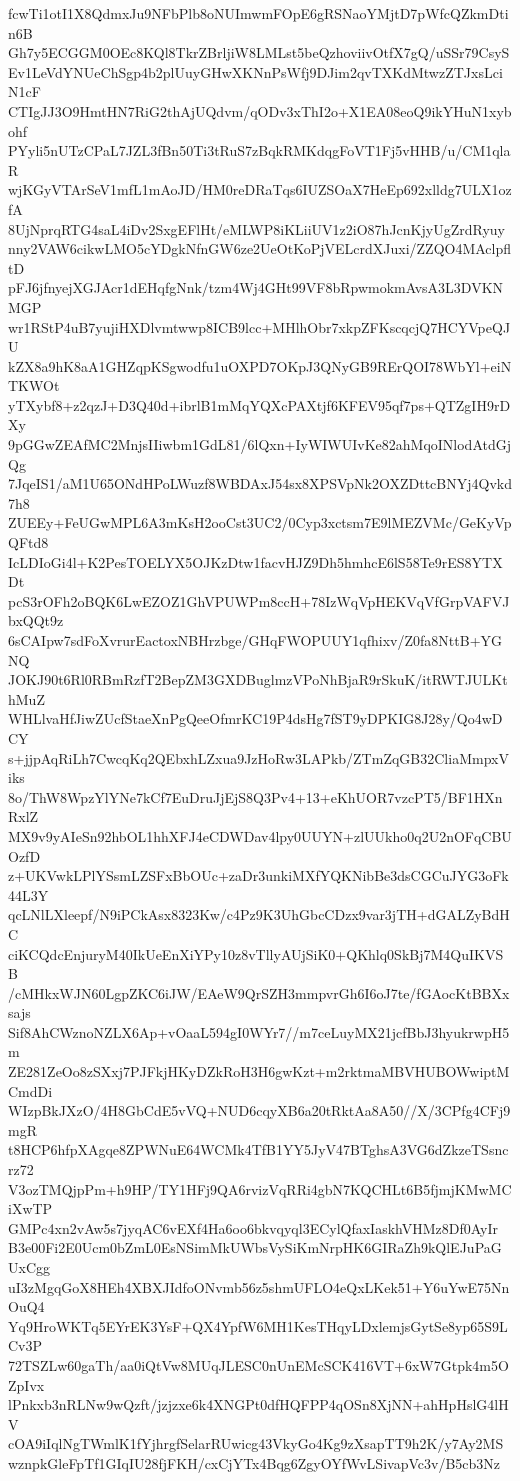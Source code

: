 fcwTi1otI1X8QdmxJu9NFbPlb8oNUImwmFOpE6gRSNaoYMjtD7pWfcQZkmDtin6B
Gh7y5ECGGM0OEc8KQl8TkrZBrljiW8LMLst5beQzhoviivOtfX7gQ/uSSr79CsyS
Ev1LeVdYNUeChSgp4b2plUuyGHwXKNnPsWfj9DJim2qvTXKdMtwzZTJxsLciN1cF
CTIgJJ3O9HmtHN7RiG2thAjUQdvm/qODv3xThI2o+X1EA08eoQ9ikYHuN1xybohf
PYyli5nUTzCPaL7JZL3fBn50Ti3tRuS7zBqkRMKdqgFoVT1Fj5vHHB/u/CM1qlaR
wjKGyVTArSeV1mfL1mAoJD/HM0reDRaTqs6IUZSOaX7HeEp692xlldg7ULX1ozfA
8UjNprqRTG4saL4iDv2SxgEFlHt/eMLWP8iKLiiUV1z2iO87hJcnKjyUgZrdRyuy
nny2VAW6cikwLMO5cYDgkNfnGW6ze2UeOtKoPjVELcrdXJuxi/ZZQO4MAclpfltD
pFJ6jfnyejXGJAcr1dEHqfgNnk/tzm4Wj4GHt99VF8bRpwmokmAvsA3L3DVKNMGP
wr1RStP4uB7yujiHXDlvmtwwp8ICB9lcc+MHlhObr7xkpZFKscqcjQ7HCYVpeQJU
kZX8a9hK8aA1GHZqpKSgwodfu1uOXPD7OKpJ3QNyGB9RErQOI78WbYl+eiNTKWOt
yTXybf8+z2qzJ+D3Q40d+ibrlB1mMqYQXcPAXtjf6KFEV95qf7ps+QTZgIH9rDXy
9pGGwZEAfMC2MnjsIIiwbm1GdL81/6lQxn+IyWIWUIvKe82ahMqoINlodAtdGjQg
7JqeIS1/aM1U65ONdHPoLWuzf8WBDAxJ54sx8XPSVpNk2OXZDttcBNYj4Qvkd7h8
ZUEEy+FeUGwMPL6A3mKsH2ooCst3UC2/0Cyp3xctsm7E9lMEZVMc/GeKyVpQFtd8
IcLDIoGi4l+K2PesTOELYX5OJKzDtw1facvHJZ9Dh5hmhcE6lS58Te9rES8YTXDt
pcS3rOFh2oBQK6LwEZOZ1GhVPUWPm8ccH+78IzWqVpHEKVqVfGrpVAFVJbxQQt9z
6sCAIpw7sdFoXvrurEactoxNBHrzbge/GHqFWOPUUY1qfhixv/Z0fa8NttB+YGNQ
JOKJ90t6Rl0RBmRzfT2BepZM3GXDBuglmzVPoNhBjaR9rSkuK/itRWTJULKthMuZ
WHLlvaHfJiwZUcfStaeXnPgQeeOfmrKC19P4dsHg7fST9yDPKIG8J28y/Qo4wDCY
s+jjpAqRiLh7CwcqKq2QEbxhLZxua9JzHoRw3LAPkb/ZTmZqGB32CliaMmpxViks
8o/ThW8WpzYlYNe7kCf7EuDruJjEjS8Q3Pv4+13+eKhUOR7vzcPT5/BF1HXnRxlZ
MX9v9yAIeSn92hbOL1hhXFJ4eCDWDav4lpy0UUYN+zlUUkho0q2U2nOFqCBUOzfD
z+UKVwkLPlYSsmLZSFxBbOUc+zaDr3unkiMXfYQKNibBe3dsCGCuJYG3oFk44L3Y
qcLNlLXleepf/N9iPCkAsx8323Kw/c4Pz9K3UhGbcCDzx9var3jTH+dGALZyBdHC
ciKCQdcEnjuryM40IkUeEnXiYPy10z8vTllyAUjSiK0+QKhlq0SkBj7M4QuIKVSB
/cMHkxWJN60LgpZKC6iJW/EAeW9QrSZH3mmpvrGh6I6oJ7te/fGAocKtBBXxsajs
Sif8AhCWznoNZLX6Ap+vOaaL594gI0WYr7//m7ceLuyMX21jcfBbJ3hyukrwpH5m
ZE281ZeOo8zSXxj7PJFkjHKyDZkRoH3H6gwKzt+m2rktmaMBVHUBOWwiptMCmdDi
WIzpBkJXzO/4H8GbCdE5vVQ+NUD6cqyXB6a20tRktAa8A50//X/3CPfg4CFj9mgR
t8HCP6hfpXAgqe8ZPWNuE64WCMk4TfB1YY5JyV47BTghsA3VG6dZkzeTSsncrz72
V3ozTMQjpPm+h9HP/TY1HFj9QA6rvizVqRRi4gbN7KQCHLt6B5fjmjKMwMCiXwTP
GMPc4xn2vAw5s7jyqAC6vEXf4Ha6oo6bkvqyql3ECylQfaxIaskhVHMz8Df0AyIr
B3e00Fi2E0Ucm0bZmL0EsNSimMkUWbsVySiKmNrpHK6GIRaZh9kQlEJuPaGUxCgg
uI3zMgqGoX8HEh4XBXJIdfoONvmb56z5shmUFLO4eQxLKek51+Y6uYwE75NnOuQ4
Yq9HroWKTq5EYrEK3YsF+QX4YpfW6MH1KesTHqyLDxlemjsGytSe8yp65S9LCv3P
72TSZLw60gaTh/aa0iQtVw8MUqJLESC0nUnEMcSCK416VT+6xW7Gtpk4m5OZpIvx
lPnkxb3nRLNw9wQzft/jzjzxe6k4XNGPt0dfHQFPP4qOSn8XjNN+ahHpHslG4lHV
cOA9iIqlNgTWmlK1fYjhrgfSelarRUwicg43VkyGo4Kg9zXsapTT9h2K/y7Ay2MS
wznpkGleFpTf1GIqIU28fjFKH/cxCjYTx4Bqg6ZgyOYfWvLSivapVc3v/B5cb3Nz
